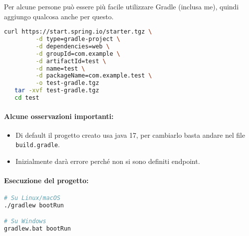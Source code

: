 Per alcune persone può essere più facile utilizzare Gradle (inclusa me), quindi aggiungo qualcosa anche per questo.



\begin{lstlisting}[language=bash, caption={Creazione di un progetto Spring Boot con Gradle}]
curl https://start.spring.io/starter.tgz \
         -d type=gradle-project \
         -d dependencies=web \
         -d groupId=com.example \
         -d artifactId=test \
         -d name=test \
         -d packageName=com.example.test \
         -o test-gradle.tgz
   tar -xvf test-gradle.tgz
   cd test
\end{lstlisting}

\paragraph{Alcune osservazioni importanti:}

\begin{itemize}
	\item Di default il progetto creato usa java 17, per cambiarlo basta andare nel file \texttt{build.gradle}.
	\item Inizialmente darà errore perché non si sono definiti endpoint.
\end{itemize}

\paragraph{Esecuzione del progetto:}

\begin{lstlisting}[language=bash, caption={Avvio del progetto Spring Boot con Gradle}]
# Su Linux/macOS
./gradlew bootRun

# Su Windows
gradlew.bat bootRun
\end{lstlisting}



